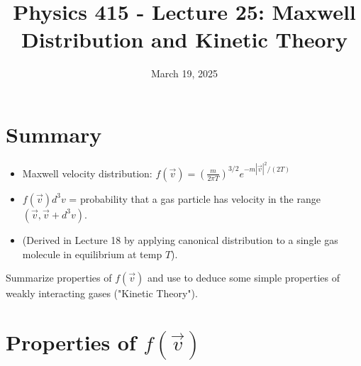 \documentclass[11pt]{article}
\title{Physics 415 - Lecture 25: Maxwell Distribution and Kinetic Theory}
\date{March 19, 2025}
\author{} %
\begin{document}
\maketitle
\thispagestyle{empty}

\section*{Summary}

\begin{itemize}
    \item Maxwell velocity distribution: $f(\vec{v}) = \left(\frac{m}{2\pi T}\right)^{3/2} e^{-m|\vec{v}|^2 / (2T)}$
    \item $f(\vec{v}) d^3v$ = probability that a gas particle has velocity in the range $(\vec{v}, \vec{v}+d^3v)$.
    \item (Derived in Lecture 18 by applying canonical distribution to a single gas molecule in equilibrium at temp $T$).
\end{itemize}
Summarize properties of $f(\vec{v})$ and use to deduce some simple properties of weakly interacting gases ("Kinetic Theory").

\section*{Properties of $f(\vec{v})$}
\end{document}
